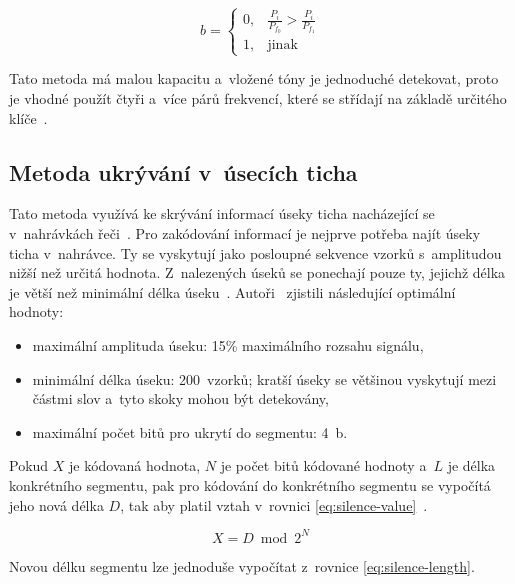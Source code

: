 \begin{equation}
    \label{eq:tone-insertion-decision-rule}
    b = \left\{
        \begin{array}{rl}
            0, & \frac{P_i}{P_{f_0}} > \frac{P_i}{P_{f_1}} \\
            1, & \mathrm{jinak}
        \end{array}
    \right.
\end{equation}

\noindent Tato metoda má malou kapacitu a~vložené tóny je jednoduché detekovat,
proto je vhodné použít čtyři a~více párů frekvencí, které se střídají na
základě určitého klíče~\cite{Djebbar2012}.

\subsection*{Metoda ukrývání v~úsecích ticha}
\label{sub:hiding-in-silence-intervals}

Tato metoda využívá ke skrývání informací úseky ticha nacházející se
v~nahrávkách řeči~\cite{Djebbar2012}. Pro zakódování informací je nejprve
potřeba najít úseky ticha v~nahrávce. Ty se vyskytují jako posloupné sekvence
vzorků s~amplitudou nižší než určitá hodnota. Z~nalezených úseků se ponechají
pouze ty, jejichž délka je větší než minimální délka úseku~\cite{Shahreza2008}.
Autoři~\cite{Shahreza2008} zjistili následující optimální hodnoty:

\begin{itemize}
    \item maximální amplituda úseku: 15\% maximálního rozsahu signálu,
    \item minimální délka úseku: 200~vzorků; kratší úseky se většinou vyskytují
        mezi částmi slov a~tyto skoky mohou být detekovány,
    \item maximální počet bitů pro ukrytí do segmentu: 4~b.
\end{itemize}

\noindent Pokud $X$ je kódovaná hodnota, $N$ je počet bitů kódované hodnoty
a~$L$ je délka konkrétního segmentu, pak pro kódování do konkrétního segmentu
se vypočítá jeho nová délka $D$, tak aby platil vztah v~rovnici
\ref{eq:silence-value}~\cite{Shahreza2008}.

\begin{equation}
    \label{eq:silence-value}
    X = D \bmod 2^N
\end{equation}

\noindent Novou délku segmentu lze jednoduše vypočítat z~rovnice
\ref{eq:silence-length}.

